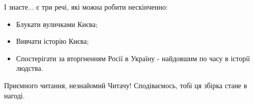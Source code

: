 І знаєте... є три речі, які можна робити нескінченно:

\begin{itemize} %
\item Блукати вуличками Києва;
\item Вивчати історію Києва;
\item Спостерігати за вторгненням Росії в Україну - найдовшим по часу в історії людства.
\end{itemize} %

Приємного читання, незнайомий Читачу! Сподіваємось, тобі ця збірка стане в нагоді.


